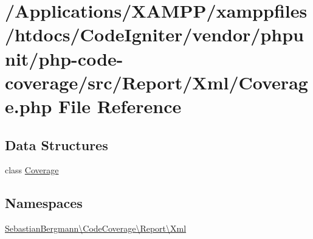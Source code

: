 \hypertarget{_coverage_8php}{}\section{/\+Applications/\+X\+A\+M\+P\+P/xamppfiles/htdocs/\+Code\+Igniter/vendor/phpunit/php-\/code-\/coverage/src/\+Report/\+Xml/\+Coverage.php File Reference}
\label{_coverage_8php}
\subsection*{Data Structures}
\begin{DoxyCompactItemize}
\item 
class \mbox{\hyperlink{class_sebastian_bergmann_1_1_code_coverage_1_1_report_1_1_xml_1_1_coverage}{Coverage}}
\end{DoxyCompactItemize}
\subsection*{Namespaces}
\begin{DoxyCompactItemize}
\item 
 \mbox{\hyperlink{namespace_sebastian_bergmann_1_1_code_coverage_1_1_report_1_1_xml}{Sebastian\+Bergmann\textbackslash{}\+Code\+Coverage\textbackslash{}\+Report\textbackslash{}\+Xml}}
\end{DoxyCompactItemize}
